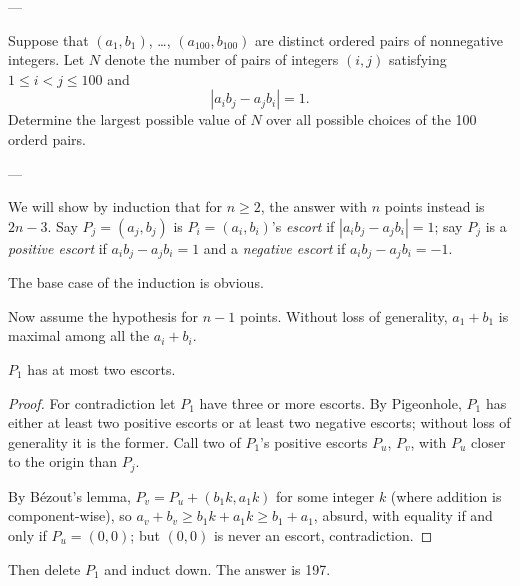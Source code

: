 
---

Suppose that $(a_1,b_1)$, \ldots, $(a_{100},b_{100})$ are distinct ordered pairs of nonnegative integers. Let $N$ denote the number of pairs of integers $(i,j)$ satisfying $1\le i<j\le100$ and
\[|a_ib_j-a_jb_i|=1.\]
Determine the largest possible value of $N$ over all possible choices of the 100 orderd pairs.

---

We will show by induction that for $n\ge2$, the answer with $n$ points instead is $2n-3$. Say $P_j=(a_j,b_j)$ is $P_i=(a_i,b_i)$'s \emph{escort} if $|a_ib_j-a_jb_i|=1$; say $P_j$ is a \emph{positive escort} if $a_ib_j-a_jb_i=1$ and a \emph{negative escort} if $a_ib_j-a_jb_i=-1$.

The base case of the induction is obvious.

Now assume the hypothesis for $n-1$ points. Without loss of generality, $a_1+b_1$ is maximal among all the $a_i+b_i$.
\begin{claim*}
    $P_1$ has at most two escorts.
\end{claim*}
\begin{proof}
    For contradiction let $P_1$ have three or more escorts. By Pigeonhole, $P_1$ has either at least two positive escorts or at least two negative escorts; without loss of generality it is the former. Call two of $P_1$'s positive escorts $P_u$, $P_v$, with $P_u$ closer to the origin than $P_j$.

    By B\'ezout's lemma, $P_v=P_u+(b_1k,a_1k)$ for some integer $k$ (where addition is component-wise), so $a_v+b_v\ge b_1k+a_1k\ge b_1+a_1$, absurd, with equality if and only if $P_u=(0,0)$; but $(0,0)$ is never an escort, contradiction.
\end{proof}

Then delete $P_1$ and induct down. The answer is 197.

